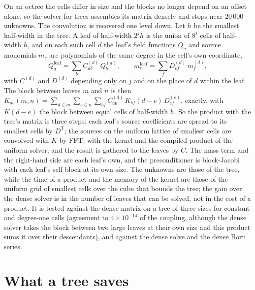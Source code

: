 \documentclass[11pt,a4paper]{article}
\begin{document}
On an octree the cells differ in size and
the blocks no longer depend on an offset alone, so the solver for trees assembles its matrix densely and
stops near $20\,000$ unknowns. The convolution is recovered one level down. Let $h$ be the smallest
half-width in the tree. A leaf of half-width $2^jh$ is the union of $8^j$ cells of half-width $h$, and
on each such cell $d$ the leaf's field functions $Q_a$ and source monomials $m_c$ are polynomials of
the same degree in the cell's own coordinate,
\begin{equation}\label{eq:reexpand}
Q_a^{\text{leaf}}=\sum_b C^{(d)}_{ab}\,Q_b^{(d)},\qquad m_c^{\text{leaf}}=\sum_f D^{(d)}_{cf}\,m_f^{(d)},
\end{equation}
with $C^{(d)}$ and $D^{(d)}$ depending only on $j$ and on the place of $d$ within the leaf. The block
between leaves $m$ and $n$ is then
$K_{ac}(m,n)=\sum_{d\in m}\sum_{e\in n}\sum_{bf}C^{(d)}_{ab}\,K_{bf}(d-e)\,D^{(e)}_{cf}$, exactly, with
$K(d-e)$ the block between equal cells of half-width $h$. So the product with the tree's matrix is three
steps: each leaf's source coefficients are spread to its smallest cells by $D^{\mathsf T}$; the sources
on the uniform lattice of smallest cells are convolved with $K$ by FFT, with the kernel and the compiled
product of the uniform solver; and the result is gathered to the leaves by $C$. The mass term and the
right-hand side are each leaf's own, and the preconditioner is block-Jacobi with each leaf's self block
at its own size. The unknowns are those of the tree, while the time of a product and the memory of the
kernel are those of the uniform grid of smallest cells over the cube that bounds the tree; the gain over
the dense solver is in the number of leaves that can be solved, not in the cost of a product. It is
tested against the dense matrix on a tree of three sizes for constant and degree-one cells (agreement to
$4\times10^{-14}$ of the coupling, although the dense solver takes the block between two large leaves at
their own size and this product sums it over their descendants), and against the dense solve and the
dense Born series.

\section{What a tree saves}\label{sec:saves}
\end{document}

